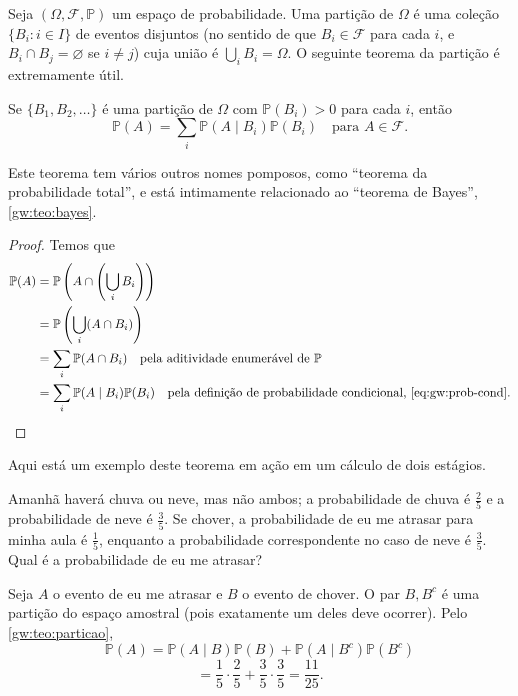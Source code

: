 Seja \((\Omega, \mathcal{F}, \mathbb{P})\) um espaço de probabilidade. Uma
partição de \(\Omega\) é uma coleção \(\{B_i : i \in I\}\) de eventos disjuntos
(no sentido de que \(B_i \in \mathcal{F}\) para cada \(i\), e \(B_i \cap B_j =
\varnothing\) se \(i \neq j\)) cuja união é \(\bigcup_i B_i = \Omega\). O
seguinte teorema da partição é extremamente útil.

\begin{theorem}\label{gw:teo:particao}
  Se \(\{B_1, B_2, \ldots\}\) é uma partição de \(\Omega\) com
  \(\mathbb{P}(B_i) > 0\) para cada \(i\), então
  \[
    \mathbb{P}(A) = \sum_i \mathbb{P}(A \mid B_i) \mathbb{P}(B_i) \quad
    \text{para } A \in \mathcal{F}.
  \]
\end{theorem}

Este teorema tem vários outros nomes pomposos, como ``teorema da probabilidade
total'', e está intimamente relacionado ao ``teorema de Bayes'',
\cref{gw:teo:bayes}.

\begin{proof}
  Temos que
  \[
    \begin{aligned}
      \mathbb{P}(A) &= \mathbb{P}\left(A \cap \left(\bigcup_i B_i\right)\right) \\
      &= \mathbb{P}\left(\bigcup_i (A \cap B_i)\right) \\
      &= \sum_i \mathbb{P}(A \cap B_i) \quad \text{pela aditividade
        enumerável de } \mathbb{P} \\
      &= \sum_i \mathbb{P}(A \mid B_i) \mathbb{P}(B_i) \quad \text{pela
        definição de probabilidade condicional, \eqref{eq:gw:prob-cond}}.
    \end{aligned}
  \]
\end{proof}

Aqui está um exemplo deste teorema em ação em um cálculo de dois estágios.

\begin{example}\label{gw:exemplo:atraso}
  Amanhã haverá chuva ou neve, mas não ambos; a probabilidade de chuva é
  \(\tfrac{2}{5}\) e a probabilidade de neve é \(\tfrac{3}{5}\). Se chover, a
  probabilidade de eu me atrasar para minha aula é \(\tfrac{1}{5}\), enquanto a
  probabilidade correspondente no caso de neve é \(\tfrac{3}{5}\). Qual é a
  probabilidade de eu me atrasar?
  \begin{solution}
    Seja \(A\) o evento de eu me atrasar e \(B\) o evento de chover. O par
    \(B, B^c\) é uma partição do espaço amostral (pois exatamente um deles
    deve ocorrer). Pelo \cref{gw:teo:particao},
    \[
      \mathbb{P}(A) = \mathbb{P}(A \mid B) \mathbb{P}(B) + \mathbb{P}(A \mid
      B^c) \mathbb{P}(B^c)
    \]
    \[
      = \frac{1}{5} \cdot \frac{2}{5} + \frac{3}{5} \cdot \frac{3}{5} =
      \frac{11}{25}.
    \]
  \end{solution}
\end{example}

